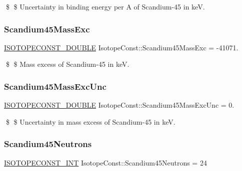 \$ \$ Uncertainty in binding energy per A of Scandium-\/45 in keV. \mbox{\label{group___isotope_const-_scandium-_sc45_gad31aa83e40c0fca5dfe3c16d6e809c21}} 
\subsubsection{\texorpdfstring{Scandium45\+Mass\+Exc}{Scandium45MassExc}}
{\footnotesize\ttfamily \mbox{\hyperlink{group___isotope_const-_macros_ga8f45a7272ce02c0b4c65c44636ed719a}{I\+S\+O\+T\+O\+P\+E\+C\+O\+N\+S\+T\+\_\+\+D\+O\+U\+B\+LE}} Isotope\+Const\+::\+Scandium45\+Mass\+Exc = -\/41071.}

\$ \$ Mass excess of Scandium-\/45 in keV. \mbox{\label{group___isotope_const-_scandium-_sc45_ga94f440f02d442db20c93baf37267e0da}} 
\subsubsection{\texorpdfstring{Scandium45\+Mass\+Exc\+Unc}{Scandium45MassExcUnc}}
{\footnotesize\ttfamily \mbox{\hyperlink{group___isotope_const-_macros_ga8f45a7272ce02c0b4c65c44636ed719a}{I\+S\+O\+T\+O\+P\+E\+C\+O\+N\+S\+T\+\_\+\+D\+O\+U\+B\+LE}} Isotope\+Const\+::\+Scandium45\+Mass\+Exc\+Unc = 0.}

\$ \$ Uncertainty in mass excess of Scandium-\/45 in keV. \mbox{\label{group___isotope_const-_scandium-_sc45_ga0d30e5feabbaaa9115ed96cf3d3a4938}} 
\subsubsection{\texorpdfstring{Scandium45\+Neutrons}{Scandium45Neutrons}}
{\footnotesize\ttfamily \mbox{\hyperlink{group___isotope_const-_macros_ga5f18360b3e99483a35c32d789e62621c}{I\+S\+O\+T\+O\+P\+E\+C\+O\+N\+S\+T\+\_\+\+I\+NT}} Isotope\+Const\+::\+Scandium45\+Neutrons = 24}

